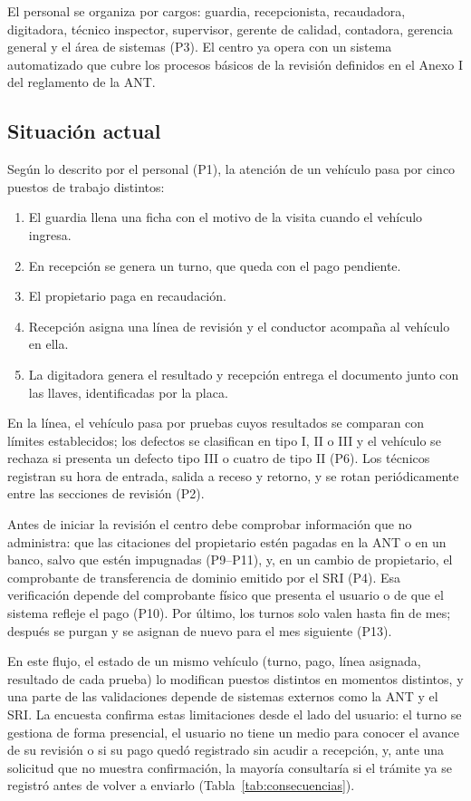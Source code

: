 \documentclass[11pt,a4paper]{article}
\begin{document}
	El personal se organiza por cargos: guardia, recepcionista, recaudadora, digitadora, técnico inspector, supervisor, gerente de calidad, contadora, gerencia general y el área de sistemas (P3). El centro ya opera con un sistema automatizado que cubre los procesos básicos de la revisión definidos en el Anexo I del reglamento de la ANT.
	
	\subsection{Situación actual}
	Según lo descrito por el personal (P1), la atención de un vehículo pasa por cinco puestos de trabajo distintos:
	\begin{enumerate}[nosep]
		\item El guardia llena una ficha con el motivo de la visita cuando el vehículo ingresa.
		\item En recepción se genera un turno, que queda con el pago pendiente.
		\item El propietario paga en recaudación.
		\item Recepción asigna una línea de revisión y el conductor acompaña al vehículo en ella.
		\item La digitadora genera el resultado y recepción entrega el documento junto con las llaves, identificadas por la placa.
	\end{enumerate}
	
	En la línea, el vehículo pasa por pruebas cuyos resultados se comparan con límites establecidos; los defectos se clasifican en tipo I, II o III y el vehículo se rechaza si presenta un defecto tipo III o cuatro de tipo II (P6). Los técnicos registran su hora de entrada, salida a receso y retorno, y se rotan periódicamente entre las secciones de revisión (P2).
	
	Antes de iniciar la revisión el centro debe comprobar información que no administra: que las citaciones del propietario estén pagadas en la ANT o en un banco, salvo que estén impugnadas (P9--P11), y, en un cambio de propietario, el comprobante de transferencia de dominio emitido por el SRI (P4). Esa verificación depende del comprobante físico que presenta el usuario o de que el sistema refleje el pago (P10). Por último, los turnos solo valen hasta fin de mes; después se purgan y se asignan de nuevo para el mes siguiente (P13).
	
	En este flujo, el estado de un mismo vehículo (turno, pago, línea asignada, resultado de cada prueba) lo modifican puestos distintos en momentos distintos, y una parte de las validaciones depende de sistemas externos como la ANT y el SRI. La encuesta confirma estas limitaciones desde el lado del usuario: el turno se gestiona de forma presencial, el usuario no tiene un medio para conocer el avance de su revisión o si su pago quedó registrado sin acudir a recepción, y, ante una solicitud que no muestra confirmación, la mayoría consultaría si el trámite ya se registró antes de volver a enviarlo (Tabla~\ref{tab:consecuencias}).
	
\end{document}
